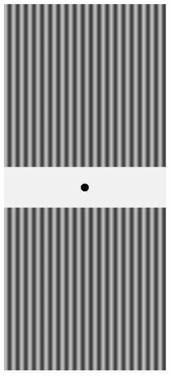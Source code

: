 \begin{figure}[h]
\begin{minipage}[b]{.19\textwidth}
    \end{minipage}
    \begin{minipage}[b]{.19\textwidth}
        \centering
        \includegraphics[keepaspectratio,width=.6\textwidth]{../../Figures/07_21_dg90.pdf}
    \end{minipage}
    \begin{minipage}[b]{.19\textwidth}
        \centering

\end{minipage}
\end{figure}
